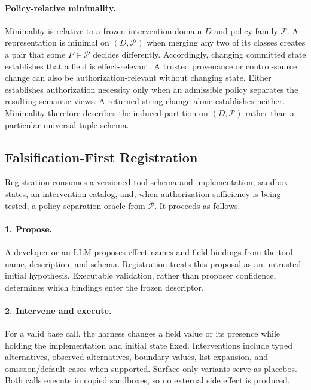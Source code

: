 \paragraph{Policy-relative minimality.}
Minimality is relative to a frozen intervention domain $D$ and policy family
$\mathcal P$.  A representation is minimal on $(D,\mathcal P)$ when merging
any two of its classes creates a pair that some $P\in\mathcal P$ decides
differently.  Accordingly, changing committed state establishes that a field
is effect-relevant.  A trusted provenance or control-source change can also be
authorization-relevant without changing state.  Either establishes
authorization necessity only when an admissible policy separates the resulting
semantic views. A returned-string change alone establishes neither. Minimality
therefore describes the induced partition on $(D,\mathcal P)$ rather than a
particular universal tuple schema.

\subsection{Falsification-First Registration}

Registration consumes a versioned tool schema and implementation, sandbox
states, an intervention catalog, and, when authorization sufficiency is being
tested, a policy-separation oracle from $\mathcal P$. It proceeds as follows.

\paragraph{1. Propose.}
A developer or an LLM proposes effect names and field bindings from the tool
name, description, and schema. Registration treats this proposal as an
untrusted initial hypothesis. Executable validation, rather than proposer
confidence, determines which bindings enter the frozen descriptor.

\paragraph{2. Intervene and execute.}
For a valid base call, the harness changes a field value or its presence while
holding the implementation and initial state fixed.  Interventions include
typed alternatives, observed alternatives, boundary values, list expansion,
and omission/default cases when supported.  Surface-only variants serve as
placebos.  Both calls execute in copied sandboxes, so no external side effect
is produced.


